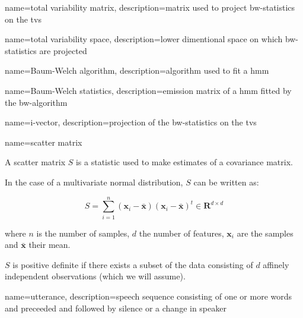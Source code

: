 


{
    name=total variability matrix,
    description={matrix used to project \gls{bw-statistics} on the \gls{tvs}}
}

{
    name=total variability space,
    description={lower dimentional space on which \gls{bw-statistics}
        are projected}
}

{
    name=Baum-Welch algorithm,
    description={algorithm used to fit a \gls{hmm}}
}

{
    name=Baum-Welch statistics,
    description={emission matrix of a \gls{hmm} fitted by the
        \gls{bw-algorithm}}
}

{
    name=i-vector,
    description={projection of the \gls{bw-statistics} on the \gls{tvs}}
}

{
    name=scatter matrix
}
{
A scatter matrix $S$ is a statistic used to make estimates of a covariance
matrix.

In the case of a multivariate normal distribution, $S$ can be written as:

$$S = \sum_{i=1}^n (\bm{x}_i - \bar{\bm{x}})
(\bm{x}_i - \bar{\bm{x}})^t \in \bm{R}^{d \times d}$$

where $n$ is the number of samples, $d$ the number of features, $\bm{x}_i$
are the samples and $\bar{\bm x}$ their mean.

$S$ is positive definite if there exists a subset of the data consisting of $d$
affinely independent observations (which we will assume).
}

{
    name=utterance,
    description={speech sequence consisting of one or more words and preceeded
                 and followed by silence or a change in speaker}
}
